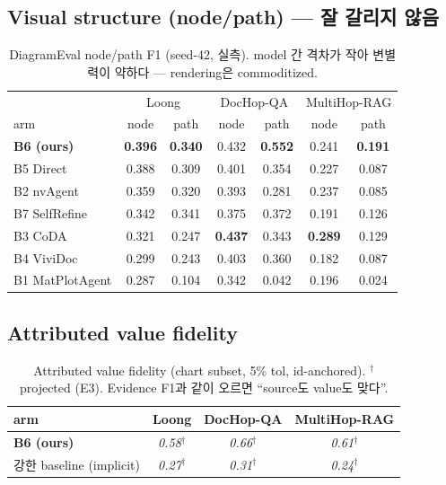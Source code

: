 \documentclass[11pt]{article}
\newcommand{\proj}[1]{\textit{#1}$^\dagger$}
\begin{document}
\subsection{Visual structure (node/path) — 잘 갈리지 않음}
\begin{table}[h]
\centering\small
\begin{tabular}{l cc cc cc}
\toprule
& \multicolumn{2}{c}{Loong} & \multicolumn{2}{c}{DocHop-QA} & \multicolumn{2}{c}{MultiHop-RAG} \\
arm & node & path & node & path & node & path \\
\midrule
\textbf{B6 (ours)} & \textbf{0.396} & \textbf{0.340} & 0.432 & \textbf{0.552} & 0.241 & \textbf{0.191} \\
B5 Direct      & 0.388 & 0.309 & 0.401 & 0.354 & 0.227 & 0.087 \\
B2 nvAgent     & 0.359 & 0.320 & 0.393 & 0.281 & 0.237 & 0.085 \\
B7 SelfRefine  & 0.342 & 0.341 & 0.375 & 0.372 & 0.191 & 0.126 \\
B3 CoDA        & 0.321 & 0.247 & \textbf{0.437} & 0.343 & \textbf{0.289} & 0.129 \\
B4 ViviDoc     & 0.299 & 0.243 & 0.403 & 0.360 & 0.182 & 0.087 \\
B1 MatPlotAgent& 0.287 & 0.104 & 0.342 & 0.042 & 0.196 & 0.024 \\
\bottomrule
\end{tabular}
\caption{DiagramEval node/path F1 (seed-42, 실측). model 간 격차가 작아 변별력이 약하다 —
rendering은 commoditized.}
\label{tab:nodepath}
\end{table}

\subsection{Attributed value fidelity}
\begin{table}[h]
\centering\small
\begin{tabular}{lccc}
\toprule
arm & Loong & DocHop-QA & MultiHop-RAG \\
\midrule
\textbf{B6 (ours)} & \proj{0.58} & \proj{0.66} & \proj{0.61} \\
강한 baseline (implicit) & \proj{0.27} & \proj{0.31} & \proj{0.24} \\
\bottomrule
\end{tabular}
\caption{Attributed value fidelity (chart subset, 5\% tol, id-anchored). $^\dagger$ projected
(E3). Evidence F1과 같이 오르면 ``source도 value도 맞다''.}
\label{tab:value}
\end{table}
\end{document}
